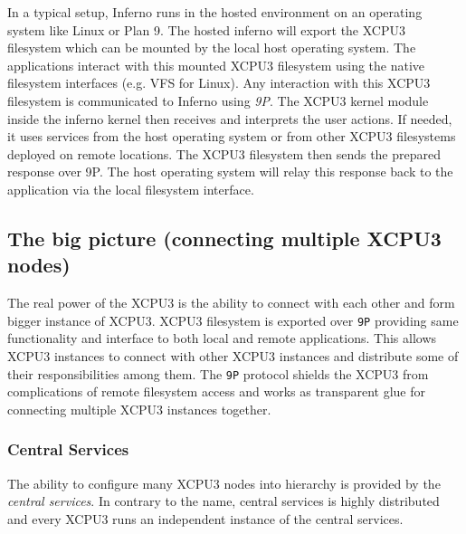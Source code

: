 \documentclass{sig-alternate}
\begin{document}
In a typical setup, Inferno runs in the hosted environment on an operating
system like Linux or Plan 9.  The hosted inferno will export the XCPU3
filesystem which can be mounted by the local host operating system. The 
applications interact with this mounted XCPU3 filesystem using the native
filesystem interfaces (e.g. VFS for Linux). Any interaction with this XCPU3
filesystem is communicated to Inferno using \textit{9P}. The XCPU3 kernel module
inside the inferno kernel then receives and interprets the user actions.  If
needed, it uses services from the host operating system or from other XCPU3
filesystems deployed on remote locations.  The XCPU3 filesystem then sends the
prepared response over 9P. The host operating system will relay this response
back to the application via the local filesystem interface.


\subsection{The big picture (connecting multiple XCPU3 nodes)}
The real power of the XCPU3 is the ability to connect with each other and form
bigger instance of XCPU3.  XCPU3 filesystem is exported over \texttt{9P}
providing same functionality and interface to both local and remote
applications.  This allows XCPU3 instances to connect with other XCPU3
instances and distribute some of their responsibilities among them.
The \texttt{9P} protocol shields the XCPU3 from complications of remote
filesystem access and works as transparent glue for connecting multiple XCPU3
instances together.

\subsubsection{Central Services}

The ability to configure many XCPU3 nodes into hierarchy is provided by the
\textit{central services}.  In contrary to the name, central services is
highly distributed and every XCPU3 runs an independent instance of the central
services.  
\end{document}
